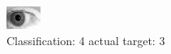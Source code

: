 \begin{figure}[h!]
\begin{center}
\includegraphics[width=0.60\columnwidth]{figures/ID248_class_4_target_3.png}
\end{center}
\caption{ Classification: 4 actual target: 3}
\label{fig:ID248_class_4_target_3}
\end{figure}
